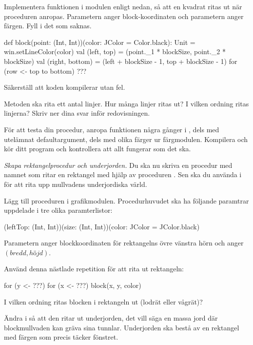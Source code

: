 \noindent Implementera funktionen  i modulen  enligt nedan, så att en kvadrat ritas ut när proceduren anropas. Parametern  anger block-koordinaten och parametern  anger färgen. Fyll i det som saknas.
\begin{Code}
  def block(point: (Int, Int))(color: JColor = Color.black): Unit = {
    win.setLineColor(color)
    val (left, top)     = (point._1 * blockSize, point._2 * blockSize)
    val (right, bottom) = (left + blockSize - 1, top + blockSize - 1)
    for (row <- top to bottom) {
      ???
    }
  }
\end{Code}
Säkerställ att koden kompilerar utan fel.

\Subtask\Pen
Metoden  ska rita ett antal linjer.
Hur många linjer ritas ut?
I vilken ordning ritas linjerna?
Skriv ner dina svar inför redovisningen.

\Subtask
För att testa din procedur, anropa funktionen  några gånger i , dels med utelämnat defaultargument, dels med olika färger ur färgmodulen. Kompilera och kör ditt program och kontrollera att allt fungerar som det ska.



\Task \emph{Skapa rektangelprocedur och underjorden.} Du ska nu skriva en procedur med namnet  som ritar en rektangel med hjälp av proceduren . Sen ska du använda  i  för att rita upp mullvadens underjordiska värld.

\Subtask
Lägg till proceduren  i grafikmodulen. Procedurhuvudet ska ha följande paramtrar uppdelade i tre olika paramterlistor:
\begin{Code}
(leftTop: (Int, Int))(size: (Int, Int))(color: JColor = JColor.black)
\end{Code}

Parametern  anger blockkoordinaten för rektangelns övre vänstra hörn och  anger $(bredd, höjd)$.

Använd denna nästlade repetition för att rita ut rektangeln:

\begin{Code}
for (y <- ???) {
	for (x <- ???) {
		block(x, y, color)
	}
}
\end{Code}

\Subtask\Pen
I vilken ordning ritas blocken i rektangeln ut (lodrät eller vågrät)?


\Subtask Ändra i  så att den ritar ut underjorden, det vill säga en massa jord där blockmullvaden kan gräva sina tunnlar.
 Underjorden ska bestå av en rektangel med färgen  som precis täcker fönstret.

